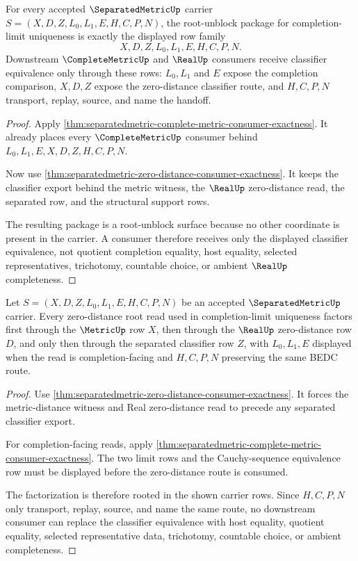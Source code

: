 \begin{theorem}
\label{thm:separatedmetric-root-unblock-completion-package}
For every accepted $\SeparatedMetricUp$ carrier $S=(X,D,Z,L_0,L_1,E,H,C,P,N)$, the root-unblock package for completion-limit uniqueness is exactly the displayed row family
$$
X,D,Z,L_0,L_1,E,H,C,P,N .
$$
Downstream $\CompleteMetricUp$ and $\RealUp$ consumers receive classifier equivalence only through these rows: $L_0,L_1$ and $E$ expose the completion comparison, $X,D,Z$ expose the zero-distance classifier route, and $H,C,P,N$ transport, replay, source, and name the handoff.
\end{theorem}
\begin{proof}
Apply \autoref{thm:separatedmetric-complete-metric-consumer-exactness}. It already places every $\CompleteMetricUp$ consumer behind $L_0,L_1,E,X,D,Z,H,C,P,N$.

Now use \autoref{thm:separatedmetric-zero-distance-consumer-exactness}. It keeps the classifier export behind the metric witness, the $\RealUp$ zero-distance read, the separated row, and the structural support rows.

The resulting package is a root-unblock surface because no other coordinate is present in the carrier. A consumer therefore receives only the displayed classifier equivalence, not quotient completion equality, host equality, selected representatives, trichotomy, countable choice, or ambient $\RealUp$ completeness.
\end{proof}

\begin{theorem}
\label{thm:separatedmetric-zero-distance-root-factorization}
Let $S=(X,D,Z,L_0,L_1,E,H,C,P,N)$ be an accepted $\SeparatedMetricUp$ carrier. Every zero-distance root read used in completion-limit uniqueness factors first through the $\MetricUp$ row $X$, then through the $\RealUp$ zero-distance row $D$, and only then through the separated classifier row $Z$, with $L_0,L_1,E$ displayed when the read is completion-facing and $H,C,P,N$ preserving the same BEDC route.
\end{theorem}
\begin{proof}
Use \autoref{thm:separatedmetric-zero-distance-consumer-exactness}. It forces the metric-distance witness and Real zero-distance read to precede any separated classifier export.

For completion-facing reads, apply \autoref{thm:separatedmetric-complete-metric-consumer-exactness}. The two limit rows and the Cauchy-sequence equivalence row must be displayed before the zero-distance route is consumed.

The factorization is therefore rooted in the shown carrier rows. Since $H,C,P,N$ only transport, replay, source, and name the same route, no downstream consumer can replace the classifier equivalence with host equality, quotient equality, selected representative data, trichotomy, countable choice, or ambient completeness.
\end{proof}

